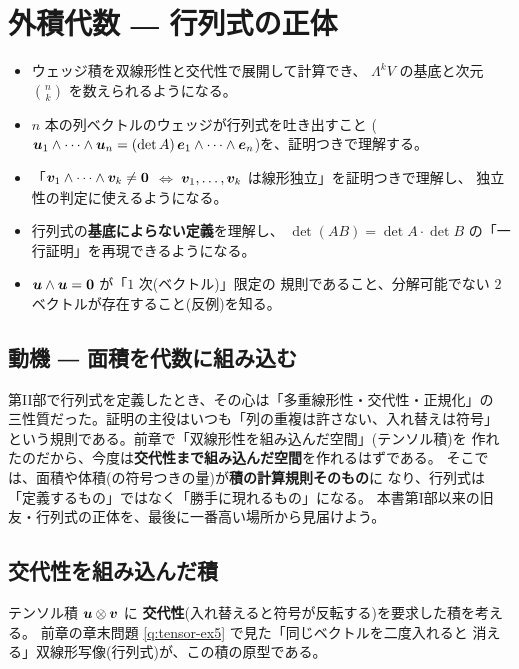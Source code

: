 \chapter{外積代数 ― 行列式の正体}\label{chap:wedge}

\begin{goal}
\begin{itemize}
\item ウェッジ積を双線形性と交代性で展開して計算でき、
$\Lambda^k V$ の基底と次元 $\binom{n}{k}$ を数えられるようになる。
\item $n$ 本の列ベクトルのウェッジが行列式を吐き出すこと
($\bm{u}_1 \wedge \cdots \wedge \bm{u}_n = (\det A)\,
\bm{e}_1 \wedge \cdots \wedge \bm{e}_n$)を、証明つきで理解する。
\item 「$\bm{v}_1 \wedge \cdots \wedge \bm{v}_k \neq \bm{0}$
$\iff$ $\bm{v}_1, \dots, \bm{v}_k$ は線形独立」を証明つきで理解し、
独立性の判定に使えるようになる。
\item 行列式の\textbf{基底によらない定義}を理解し、
$\det(AB) = \det A \cdot \det B$ の「一行証明」を再現できるようになる。
\item $\bm{u} \wedge \bm{u} = \bm{0}$ が「$1$ 次(ベクトル)」限定の
規則であること、分解可能でない $2$ ベクトルが存在すること(反例)を知る。
\end{itemize}
\end{goal}

\section{動機 ― 面積を代数に組み込む}

第II部で行列式を定義したとき、その心は「多重線形性・交代性・正規化」の
三性質だった。証明の主役はいつも「列の重複は許さない、入れ替えは符号」
という規則である。前章で「双線形性を組み込んだ空間」(テンソル積)を
作れたのだから、今度は\textbf{交代性まで組み込んだ空間}を作れるはずである。
そこでは、面積や体積(の符号つきの量)が\textbf{積の計算規則そのもの}に
なり、行列式は「定義するもの」ではなく「勝手に現れるもの」になる。
本書第I部以来の旧友・行列式の正体を、最後に一番高い場所から見届けよう。

\section{交代性を組み込んだ積}

テンソル積 $\bm{u} \otimes \bm{v}$ に
\textbf{交代性}(入れ替えると符号が反転する)を要求した積を考える。
前章の章末問題 \ref{q:tensor-ex5} で見た「同じベクトルを二度入れると
消える」双線形写像(行列式)が、この積の原型である。

